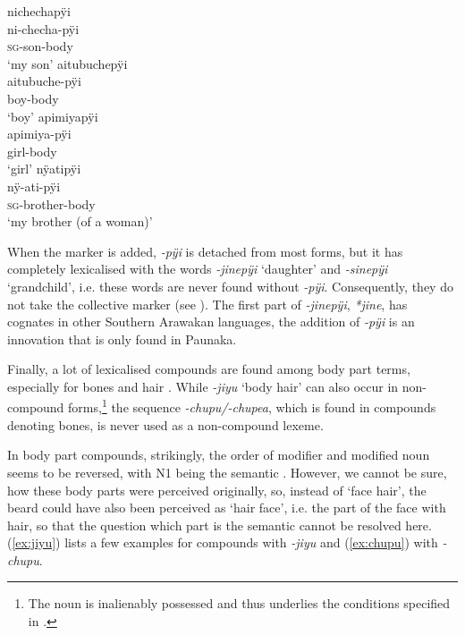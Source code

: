 \ea\label{ex:buddy-body}
  \ea\label{ex:buddy-body.1}
\begingl
\glpreamble nichechapÿi\\
\gla ni-checha-pÿi\\
\textsc{sg}-son-body\\
\glft ‘my son’
\endgl
  \ex\label{ex:buddy-body.2}
\begingl
\glpreamble aitubuchepÿi\\
\gla aitubuche-pÿi\\
\glb boy-body\\
\glft ‘boy’
\endgl
  \ex\label{ex:buddy-body.3}
\begingl
\glpreamble apimiyapÿi\\
\gla apimiya-pÿi\\
\glb girl-body\\
\glft ‘girl’
\endgl
  \ex\label{ex:buddy-body.4}
\begingl
\glpreamble nÿatipÿi\\
\gla nÿ-ati-pÿi\\
\textsc{sg}-brother-body\\
\glft ‘my brother (of a woman)’
\endgl
\z
\xe

When the  marker is added, \textit{-pÿi} is detached from most forms, but it has completely lexicalised with the words \textit{-jinepÿi} ‘daughter’ and \textit{-sinepÿi} ‘grandchild’, i.e. these words are never found without \textit{-pÿi}. Consequently, they do not take the collective marker (see ).
The first part of \textit{-jinepÿi}, \textit{*jine}, has cognates in other Southern Arawakan languages, the addition of \textit{-pÿi} is an innovation that is only found in Paunaka.%

Finally, a lot of lexicalised compounds are found among body part terms, especially for bones and hair \citep[255]{TerhartDanielsenBODY}. While \textit{-jiyu} ‘body hair’ can also occur in non-compound forms,\footnote{The noun is inalienably possessed and thus underlies the conditions specified in .} the sequence \textit{-chupu/-chupea}, which is found in compounds denoting bones, is never used as a non-compound lexeme. 

In body part compounds, strikingly, the order of modifier and modified noun seems to be reversed, with N1 being the semantic . However, we cannot be sure, how these body parts were perceived originally, so, instead of ‘face hair’, the beard could have also been perceived as ‘hair face’, i.e. the part of the face with hair, so that the question which part is the semantic  cannot be resolved here. (\ref{ex:jiyu}) lists a few examples for compounds with \textit{-jiyu} and (\ref{ex:chupu}) with \textit{-chupu}.

